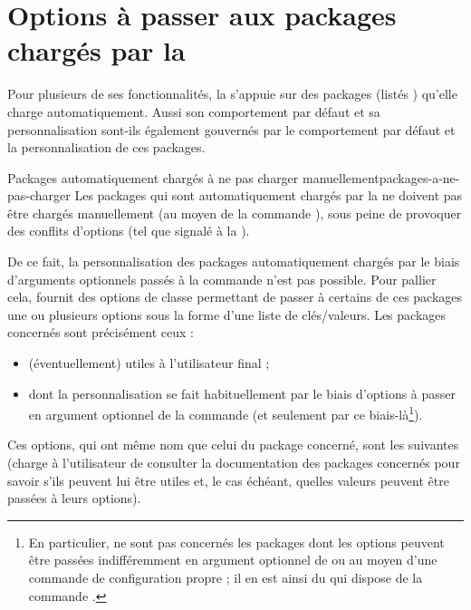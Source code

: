 \section{Options à passer aux packages chargés par la \yatCl{}}
\label{sec-options-passer-aux}%
%

%
%
Pour plusieurs de ses fonctionnalités, la \yatCl{} s'appuie sur des packages
(listés ) qu'elle charge automatiquement. Aussi
son comportement par défaut et sa personnalisation sont-ils également gouvernés
par le comportement par défaut et la personnalisation de ces packages.

\begin{dbwarning}{Packages automatiquement chargés à ne pas charger
    manuellement}{packages-a-ne-pas-charger}
  Les packages qui sont automatiquement chargés par la \yatCl{} ne doivent pas
  être chargés manuellement (au moyen de la commande
  ), sous peine de provoquer des conflits d'options
  (tel que signalé à la ).
\end{dbwarning}

De ce fait, la personnalisation des packages automatiquement chargés par le
biais d'arguments optionnels passés à la commande 
n'est pas possible. Pour pallier cela, \yat{} fournit des options de classe
permettant de passer à certains de ces packages une ou plusieurs options sous
la forme d'une liste de clés/valeurs. Les packages concernés sont précisément
ceux :
\begin{itemize}
\item (éventuellement) utiles à l'utilisateur final ;
\item dont la personnalisation se fait habituellement par le biais d'options
  à passer en argument optionnel de la commande  (et
  seulement par ce biais-là\footnote{En particulier, ne sont pas concernés les
    packages dont les options peuvent être passées indifféremment en argument
    optionnel de \protect{} ou au moyen d'une commande
    de configuration propre ; il en est ainsi du  qui dispose
    de la commande \protect{}.}).
\end{itemize}
Ces options, qui ont même nom que celui du package concerné, sont les suivantes
(charge à l'utilisateur de consulter la documentation des packages concernés
pour savoir s'ils peuvent lui être utiles et, le cas échéant, quelles valeurs
peuvent être passées à leurs options).

